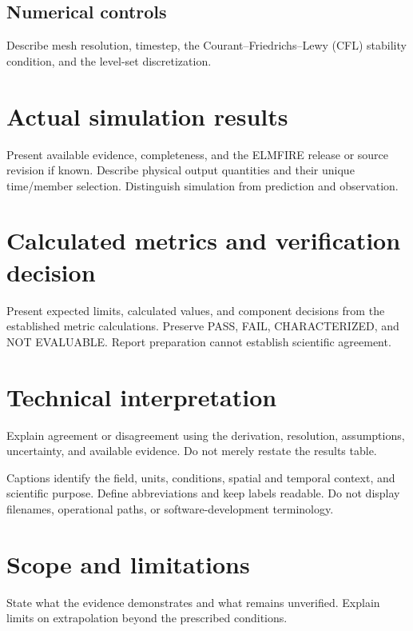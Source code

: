 \documentclass[../report/case_report.tex]{subfiles}
\begin{document}
\subsection{Numerical controls}
Describe mesh resolution, timestep, the Courant--Friedrichs--Lewy (CFL)
stability condition, and the level-set discretization.


\section{Actual simulation results}
Present available evidence, completeness, and the ELMFIRE release or source
revision if known. Describe physical output quantities and their unique
time/member selection. Distinguish simulation from prediction and observation.


\section{Calculated metrics and verification decision}
Present expected limits, calculated values, and component decisions from the
established metric calculations. Preserve PASS, FAIL, CHARACTERIZED, and
NOT EVALUABLE. Report preparation cannot establish scientific agreement.


\section{Technical interpretation}
Explain agreement or disagreement using the derivation, resolution, assumptions,
uncertainty, and available evidence. Do not merely restate the results table.


Captions identify the field, units, conditions, spatial and temporal context,
and scientific purpose. Define abbreviations and keep labels readable. Do not
display filenames, operational paths, or software-development terminology.


\section{Scope and limitations}
State what the evidence demonstrates and what remains unverified. Explain
limits on extrapolation beyond the prescribed conditions.
\end{document}

